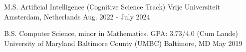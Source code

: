 
\begin{cventries}
  \cventry
    {M.S. Artificial Intelligence (Cognitive Science Track)} %
    {Vrije Universiteit} %
    {Amsterdam, Netherlands} %
    {Aug. 2022 - July 2024} %
    {}

  \cventry
    {B.S. Computer Science, minor in Mathematics.  GPA: 3.73/4.0 (Cum Laude)} %
    {University of Maryland Baltimore County (UMBC)} %
    {Baltimore, MD} %
    {May 2019} %
    {
    }

\end{cventries}
